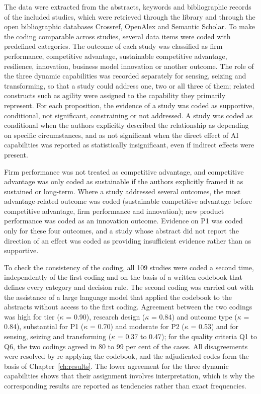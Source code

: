 The data were extracted from the abstracts, keywords and bibliographic records of the included studies, which were retrieved through the library and through the open bibliographic databases Crossref, OpenAlex and Semantic Scholar. To make the coding comparable across studies, several data items were coded with predefined categories. The outcome of each study was classified as firm performance, competitive advantage, sustainable competitive advantage, resilience, innovation, business model innovation or another outcome. The role of the three dynamic capabilities was recorded separately for sensing, seizing and transforming, so that a study could address one, two or all three of them; related constructs such as agility were assigned to the capability they primarily represent. For each proposition, the evidence of a study was coded as supportive, conditional, not significant, constraining or not addressed. A study was coded as conditional when the authors explicitly described the relationship as depending on specific circumstances, and as not significant when the direct effect of AI capabilities was reported as statistically insignificant, even if indirect effects were present.

Firm performance was not treated as competitive advantage, and competitive advantage was only coded as sustainable if the authors explicitly framed it as sustained or long-term. Where a study addressed several outcomes, the most advantage-related outcome was coded (sustainable competitive advantage before competitive advantage, firm performance and innovation); new product performance was coded as an innovation outcome. Evidence on P1 was coded only for these four outcomes, and a study whose abstract did not report the direction of an effect was coded as providing insufficient evidence rather than as supportive.

To check the consistency of the coding, all 109 studies were coded a second time, independently of the first coding and on the basis of a written codebook that defines every category and decision rule. The second coding was carried out with the assistance of a large language model that applied the codebook to the abstracts without access to the first coding. Agreement between the two codings was high for tier ($\kappa$ = 0.90), research design ($\kappa$ = 0.84) and outcome type ($\kappa$ = 0.84), substantial for P1 ($\kappa$ = 0.70) and moderate for P2 ($\kappa$ = 0.53) and for sensing, seizing and transforming ($\kappa$ = 0.37 to 0.47); for the quality criteria Q1 to Q6, the two codings agreed in 80 to 99 per cent of the cases. All disagreements were resolved by re-applying the codebook, and the adjudicated codes form the basis of Chapter~\ref{ch:results}. The lower agreement for the three dynamic capabilities shows that their assignment involves interpretation, which is why the corresponding results are reported as tendencies rather than exact frequencies.

